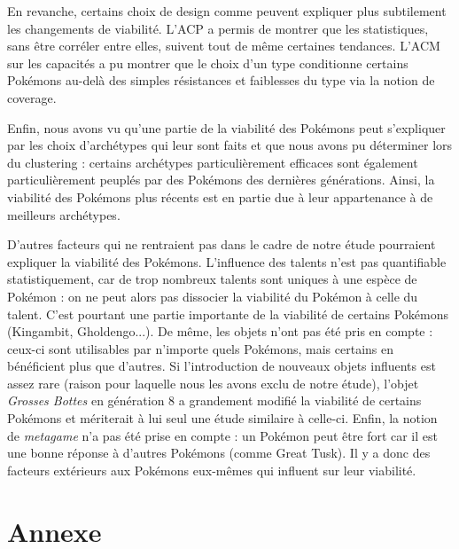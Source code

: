 \documentclass[a4paper,12pt]{article}
\begin{document}
En revanche, certains choix de design comme peuvent expliquer plus subtilement
les changements de viabilité. L'ACP a permis de montrer que les statistiques,
sans être corréler entre elles, suivent tout de même certaines tendances. L'ACM
sur les capacités a pu montrer que le choix d'un type conditionne certains
Pokémons au-delà des simples résistances et faiblesses du type via la notion de
coverage.

Enfin, nous avons vu qu'une partie de la viabilité des Pokémons peut s'expliquer
par les choix d'archétypes qui leur sont faits et que nous avons pu déterminer
lors du clustering : certains archétypes particulièrement efficaces sont
également particulièrement peuplés par des Pokémons des dernières générations.
Ainsi, la viabilité des Pokémons plus récents est en partie due à leur
appartenance à de meilleurs archétypes.

D'autres facteurs qui ne rentraient pas dans le cadre de notre étude pourraient expliquer la viabilité des Pokémons.
L'influence des talents n'est pas quantifiable statistiquement, car de trop nombreux talents
sont uniques à une espèce de Pokémon : on ne peut alors pas dissocier la
viabilité du Pokémon à celle du talent. C'est pourtant une partie importante de
la viabilité de certains Pokémons (Kingambit, Gholdengo...). De même, les objets
n'ont pas été pris en compte : ceux-ci sont utilisables par n'importe quels
Pokémons, mais certains en bénéficient plus que d'autres. Si l'introduction de
nouveaux objets influents est assez rare (raison pour laquelle nous les avons exclu
de notre étude), l'objet \textit{Grosses Bottes} en génération 8 a grandement
modifié la viabilité de certains Pokémons et mériterait à lui seul une étude
similaire à celle-ci. Enfin, la notion de \textit{metagame} n'a pas été prise en compte : un Pokémon peut être fort car il est une bonne réponse à d'autres Pokémons (comme Great Tusk). Il y a donc des facteurs extérieurs aux Pokémons eux-mêmes qui influent sur leur viabilité.
\newpage
\section{Annexe}
\end{document}
